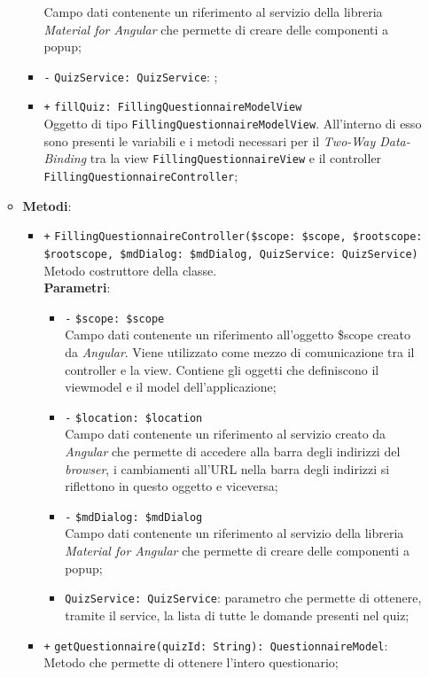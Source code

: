 \begin{itemize}
\begin{itemize}
\begin{itemize}
		Campo dati contenente un riferimento al servizio della libreria \textit{Material for Angular} che permette di creare delle componenti a popup;
		\item \texttt{-} \texttt{QuizService: QuizService}: ;
		\item \texttt{+} \texttt{fillQuiz: FillingQuestionnaireModelView} \\
		Oggetto di tipo \texttt{FillingQuestionnaireModelView}. All'interno di esso sono presenti le variabili e i metodi necessari per il \textit{Two-Way Data-Binding} tra la view \texttt{FillingQuestionnaireView} e il controller \texttt{FillingQuestionnaireController};
	\end{itemize}
	\item \textbf{Metodi}:
	\begin{itemize}
		\item \texttt{+} \texttt{FillingQuestionnaireController(\$scope: \$scope, \$rootscope: \$rootscope, \$mdDialog: \$mdDialog, QuizService: QuizService)} \\Metodo costruttore della classe.\\
		\textbf{Parametri}:
		\begin{itemize}
			\item \texttt{-} \texttt{\$scope: \$scope} \\
			Campo dati contenente un riferimento all’oggetto \$scope creato da \textit{Angular}. Viene utilizzato come mezzo di comunicazione tra il controller e la view. Contiene gli oggetti che definiscono il viewmodel e il model dell’applicazione;
			\item \texttt{-} \texttt{\$location: \$location} \\
			Campo dati contenente un riferimento al servizio creato da \textit{Angular} che permette di accedere alla barra degli indirizzi del \textit{browser}, i cambiamenti all’URL nella barra degli indirizzi si riflettono in questo oggetto e viceversa;
			\item \texttt{-} \texttt{\$mdDialog: \$mdDialog} \\
			Campo dati contenente un riferimento al servizio della libreria \textit{Material for Angular} che permette di creare delle componenti a popup;
			\item \texttt{QuizService: QuizService}: parametro che permette di ottenere, tramite il service, la lista di tutte le domande presenti nel quiz;
		\end{itemize}
		\item \texttt{+} \texttt{getQuestionnaire(quizId: String): QuestionnaireModel}: \\ Metodo che permette di ottenere l'intero questionario; \\

\end{itemize}
\end{itemize}
\end{itemize}
